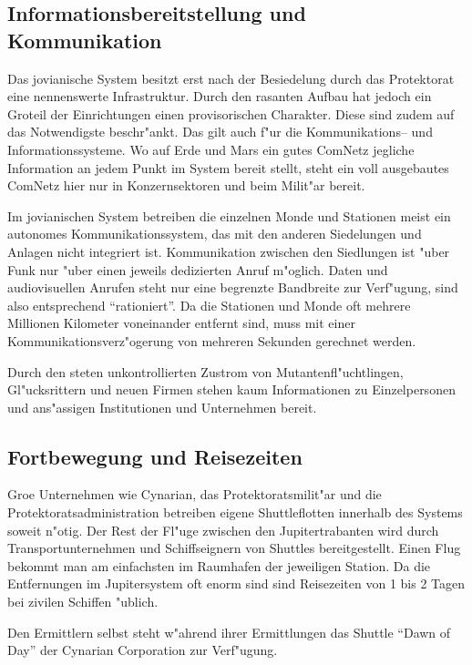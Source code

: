\subsection{Informationsbereitstellung und Kommunikation}

Das jovianische System besitzt erst nach der Besiedelung durch das Protektorat eine nennenswerte Infrastruktur. Durch den rasanten Aufbau hat jedoch ein Gro\3teil der Einrichtungen einen provisorischen Charakter. Diese sind zudem auf das Notwendigste beschr"ankt. Das gilt auch f"ur die Kommunikations-- und Informationssysteme. Wo auf Erde und Mars ein gutes ComNetz jegliche Information an jedem Punkt im System bereit stellt, steht ein voll ausgebautes ComNetz hier nur in Konzernsektoren und beim Milit"ar bereit.

Im jovianischen System  betreiben die einzelnen Monde und Stationen meist ein autonomes Kommunikationssystem, das mit den anderen Siedelungen und Anlagen nicht integriert ist. Kommunikation zwischen den Siedlungen ist "uber Funk nur "uber einen jeweils dedizierten Anruf m"oglich. Daten und audiovisuellen Anrufen steht nur eine begrenzte Bandbreite zur Verf"ugung, sind also entsprechend "`rationiert"'. Da die Stationen und Monde oft mehrere Millionen Kilometer voneinander entfernt sind, muss mit einer Kommunikationsverz"ogerung von mehreren Sekunden gerechnet werden.

Durch den steten unkontrollierten Zustrom von Mutantenfl"uchtlingen, Gl"ucksrittern und neuen Firmen stehen kaum Informationen zu Einzelpersonen und ans"assigen Institutionen und Unternehmen bereit.

\subsection{Fortbewegung und Reisezeiten}

Gro\3e Unternehmen wie Cynarian, das Protektoratsmilit"ar und die Protektoratsadministration betreiben eigene Shuttleflotten innerhalb des Systems soweit n"otig. Der Rest der Fl"uge zwischen den Jupitertrabanten wird durch Transportunternehmen und Schiffseignern von Shuttles bereitgestellt. Einen Flug bekommt man am einfachsten im Raumhafen der jeweiligen Station. Da die Entfernungen im Jupitersystem oft enorm sind sind Reisezeiten von 1 bis 2 Tagen bei zivilen Schiffen "ublich.

Den Ermittlern selbst steht w"ahrend ihrer Ermittlungen das Shuttle "`Dawn of Day"' der Cynarian Corporation zur Verf"ugung.

